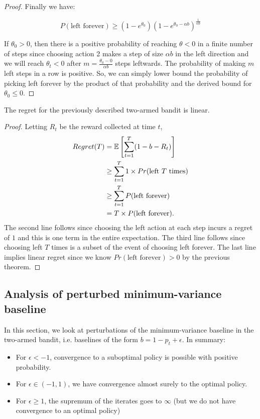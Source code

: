 \begin{proof}
Finally we have:

\[ P(\text{left forever}) \ge (1-e^{\theta_0}) (1-e^{\theta_0 - \alpha b})^\frac{1}{\alpha b}  \] 


If $\theta_0 > 0$, then there is a positive probability of reaching $\theta < 0$ in a finite number of steps since choosing action 2 makes a step of size $\alpha b$ in the left direction and we will reach $\theta_t < 0$ after $m = \frac{\theta_0 - 0}{\alpha b}$ steps leftwards. The probability of making $m$ left steps in a row is positive. 
So, we can simply lower bound the probability of picking left forever by the product of that probability and the derived bound for $\theta_0 \le 0$.
\end{proof}

\begin{corollary} \label{cor:twoarm_linear_regret}
The regret for the previously described two-armed bandit is linear.
\end{corollary}
\begin{proof}
Letting $R_t$ be the reward collected at time $t$,
\begin{align*}
    Regret(T) &= \mathbb{E} \left[ \sum_{t=1}^T (1-b - R_t) \right] \\
    &\ge \sum_{t=1}^T 1 \times Pr(\text{left $T$ times}) \\
    &\ge \sum_{t=1}^T P(\text{left forever}) \\
    &= T \times  P(\text{left forever}).
\end{align*}
The second line follows since choosing the left action at each step incurs a regret of $1$ and this is one term in the entire expectation.
The third line follows since choosing left $T$ times is a subset of the event of choosing left forever.
The last line implies linear regret since we know $Pr(\text{left forever}) > 0$ by the previous theorem.
\end{proof}


\subsection{Analysis of perturbed minimum-variance baseline} \label{sec:appendix_perturbed_minvar}

In this section, we look at perturbations of the minimum-variance baseline in the two-armed bandit, i.e. baselines of the form $b = 1-p_t + \epsilon$.
In summary:
\begin{itemize}
    \item For $\epsilon < -1$, convergence to a suboptimal policy is possible with positive probability.
    \item For $\epsilon \in (-1, 1)$, we have convergence almost surely to the optimal policy.
    \item For $\epsilon \ge 1$, the supremum of the iterates goes to $\infty$ (but we do not have convergence to an optimal policy)
\end{itemize}

